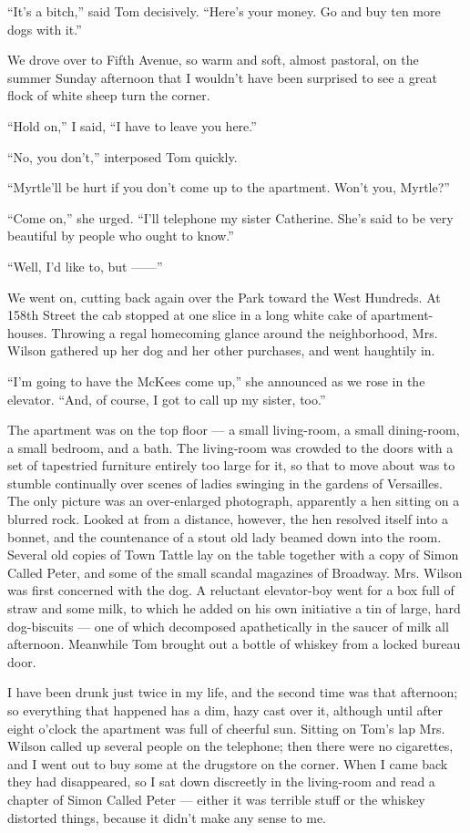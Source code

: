 \documentclass{znotebook}
\begin{document}
``It's a bitch,'' said Tom decisively. ``Here's your money. Go and buy ten more dogs with it.''

We drove over to Fifth Avenue, so warm and soft, almost pastoral, on the summer Sunday afternoon that I wouldn't have been surprised to see a great flock of white sheep turn the corner.

``Hold on,'' I said, ``I have to leave you here.''

``No, you don't,'' interposed Tom quickly.

``Myrtle'll be hurt if you don't come up to the apartment. Won't you, Myrtle?''

``Come on,'' she urged. ``I'll telephone my sister Catherine. She's said to be very beautiful by people who ought to know.''

``Well, I'd like to, but ——''

We went on, cutting back again over the Park toward the West Hundreds. At 158th Street the cab stopped at one slice in a long white cake of apartment-houses. Throwing a regal homecoming glance around the neighborhood, Mrs. Wilson gathered up her dog and her other purchases, and went haughtily in.

``I'm going to have the McKees come up,'' she announced as we rose in the elevator. ``And, of course, I got to call up my sister, too.''

The apartment was on the top floor — a small living-room, a small dining-room, a small bedroom, and a bath. The living-room was crowded to the doors with a set of tapestried furniture entirely too large for it, so that to move about was to stumble continually over scenes of ladies swinging in the gardens of Versailles. The only picture was an over-enlarged photograph, apparently a hen sitting on a blurred rock. Looked at from a distance, however, the hen resolved itself into a bonnet, and the countenance of a stout old lady beamed down into the room. Several old copies of Town Tattle lay on the table together with a copy of Simon Called Peter, and some of the small scandal magazines of Broadway. Mrs. Wilson was first concerned with the dog. A reluctant elevator-boy went for a box full of straw and some milk, to which he added on his own initiative a tin of large, hard dog-biscuits — one of which decomposed apathetically in the saucer of milk all afternoon. Meanwhile Tom brought out a bottle of whiskey from a locked bureau door.

I have been drunk just twice in my life, and the second time was that afternoon; so everything that happened has a dim, hazy cast over it, although until after eight o'clock the apartment was full of cheerful sun. Sitting on Tom's lap Mrs. Wilson called up several people on the telephone; then there were no cigarettes, and I went out to buy some at the drugstore on the corner. When I came back they had disappeared, so I sat down discreetly in the living-room and read a chapter of Simon Called Peter — either it was terrible stuff or the whiskey distorted things, because it didn't make any sense to me.
\end{document}
